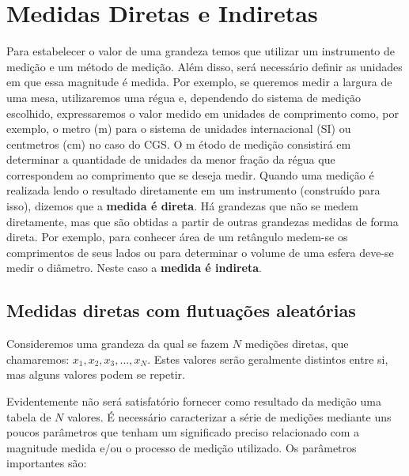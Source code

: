 \chapter{Medidas Diretas e Indiretas}
\label{sec:medidasDir&Indir}
\vspace{-0.5cm}
Para estabelecer o valor de uma grandeza temos que utilizar um instrumento de medi\c c\~ao e um m\'etodo de medi\c c\~ao. Al\'em disso, ser\'a necess\'ario definir as unidades em que essa magnitude \'e medida. Por exemplo, se queremos medir a largura de uma mesa, utilizaremos uma r\'egua e, dependendo do sistema de medi\c c\~ao escolhido, expressaremos o valor medido em unidades de comprimento como, por exemplo, o metro (m) para o sistema de unidades internacional (SI) ou centmetros (cm) no caso do CGS. O m \'etodo de medi\c c\~ao consistir\'a em determinar a quantidade de unidades da menor fra\c c\~ao da r\'egua que correspondem ao comprimento que se deseja medir. Quando uma medi\c c\~ao  \'e realizada lendo o resultado diretamente em um instrumento (constru\'ido para isso), dizemos que a {\bf medida \'e direta}. H\'a grandezas que n\~ao se medem diretamente, mas que s\~ao obtidas a partir de outras grandezas medidas de forma direta.  Por exemplo, para conhecer \'area de um ret\^angulo medem-se os comprimentos de seus lados ou para determinar o volume de uma esfera deve-se medir o di\^ametro.  Neste caso a {\bf medida \'e indireta}. 
\section*{Medidas diretas com flutua\c c\~oes aleat\'orias}\label{stat}

Consideremos uma grandeza da qual se fazem $N$ medi\c c\~oes diretas, que chamaremos: $x_1, x_2, x_3, ... , x_N$. Estes valores ser\~ao geralmente distintos entre si, mas alguns valores podem se repetir. 

Evidentemente n\~ao ser\'a satisfat\'orio fornecer como resultado da medi\c c\~ao uma tabela de $N$ valores. \'E necess\'ario caracterizar a s\'erie de medi\c c\~oes mediante uns poucos par\^ametros que tenham um significado preciso relacionado com a magnitude medida e/ou o processo de medi\c c\~ao utilizado. Os par\^ametros importantes s\~ao:

